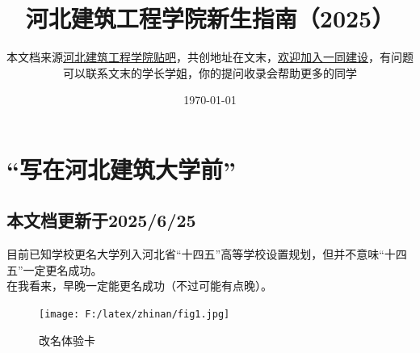 \documentclass[12pt]{article} %
\title{河北建筑工程学院新生指南（2025）}
\author{本文档来源\href{https://tieba.baidu.com/p/9062077312?pn=1}{河北建筑工程学院贴吧}，共创地址在文末，\href{https://github.com/ditian-tai/HBACE-Guide-for-Freshmen}{欢迎加入一同建设}，有问题可以联系文末的学长学姐，你的提问收录会帮助更多的同学}
\date{\today} %
\begin{document}
	
	\maketitle %
	\thispagestyle{empty} %
	
	\tableofcontents %
	\clearpage
	
	\pagestyle{fancy}
	\fancyhf{} %
	\cfoot{} %
\rfoot{\color{color2}\thepage} 
	
\section{“写在河北建筑大学前”}
	\subsection*{本文档更新于2025/6/25}

目前已知学校更名大学列入河北省“十四五”高等学校设置规划，但并不意味“十四五”一定更名成功。\\

在我看来，早晚一定能更名成功（不过可能有点晚）。\\

	\begin{figure}[!h]
	\centering
	\texttt{[image: F:/latex/zhinan/fig1.jpg]}
	\caption{改名体验卡} %
	\end{figure}
	
	\newpage
	
	
	
	
	
	
\end{document}
